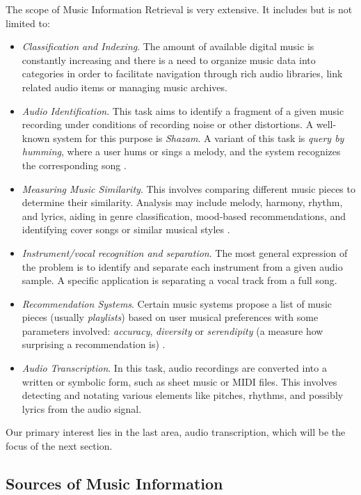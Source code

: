 The scope of Music Information Retrieval is very extensive. It includes but is not limited to:
\begin{itemize}
	\item \emph{Classification and Indexing}. The amount of available digital music is constantly increasing \cite{Orio2006} and there is a need to organize music data into categories in order to facilitate navigation through rich audio libraries, link related audio items or managing music archives.
	\item \emph{Audio Identification}. This task aims to identify a fragment of a given music recording under conditions of recording noise or other distortions. A well-known system for this purpose is \emph{Shazam}. A variant of this task is \emph{query by humming}, where a user hums or sings a melody, and the system recognizes the corresponding song \cite{Schedl2014}.
	\item \emph{Measuring Music Similarity}. This involves comparing different music pieces to determine their similarity. Analysis may include melody, harmony, rhythm, and lyrics, aiding in genre classification, mood-based recommendations, and identifying cover songs or similar musical styles \cite{Berenzweig2003}.
	\item \emph{Instrument/vocal recognition and separation}. The most general expression of the problem is to identify and separate each instrument from a given audio sample. A specific application is separating a vocal track from a full song.
	\item \emph{Recommendation Systems}. Certain music systems propose a list of music pieces (usually \emph{playlists}) based on user musical preferences with some parameters involved: \emph{accuracy}, \emph{diversity} or \emph{serendipity} (a measure how surprising a recommendation is) \cite{Schedl2014}.
	\item \emph{Audio Transcription}. In this task, audio recordings are converted into a written or symbolic form, such as sheet music or MIDI files. This involves detecting and notating various elements like pitches, rhythms, and possibly lyrics from the audio signal.
\end{itemize}

Our primary interest lies in the last area, audio transcription, which will be the focus of the next section.

\subsection{Sources of Music Information}

